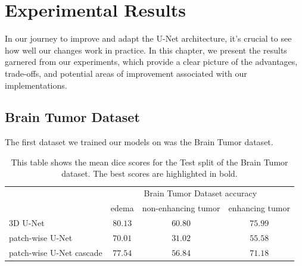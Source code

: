 \chapter{Experimental Results}

In our journey to improve and adapt the U-Net architecture, it's crucial to see how well our changes work in practice. In this chapter,
we present the results garnered from our experiments, which provide a clear picture of the advantages, trade-offs, and potential areas of improvement associated with our implementations.

\section{Brain Tumor Dataset}
The first dataset we trained our models on was the Brain Tumor dataset.

\begin{table}[ht!]
\begin{center} {\footnotesize
\begin{tabular}{lccc}
\hline
	& \multicolumn{3}{c}{Brain Tumor Dataset accuracy} \\
	& \multicolumn{1}{c}{edema} & \multicolumn{1}{c}{non-enhancing tumor} & \multicolumn{1}{c}{enhancing tumor}\\
\hline
3D U-Net & $\mathbf{80.13}$ & $\mathbf{60.80}$ & $\mathbf{75.99}$ \\[1ex]
patch-wise U-Net & $70.01$ & $31.02$ & $55.58$ \\[1ex]
patch-wise U-Net cascade & $77.54$ & $56.84$ & $71.18$ \\[1ex]
\hline
\end{tabular} }
\end{center}
\caption{\footnotesize This table shows the mean dice scores for the Test split of the Brain Tumor dataset. The best scores are highlighted in bold.}
\label{turns}
\end{table}

